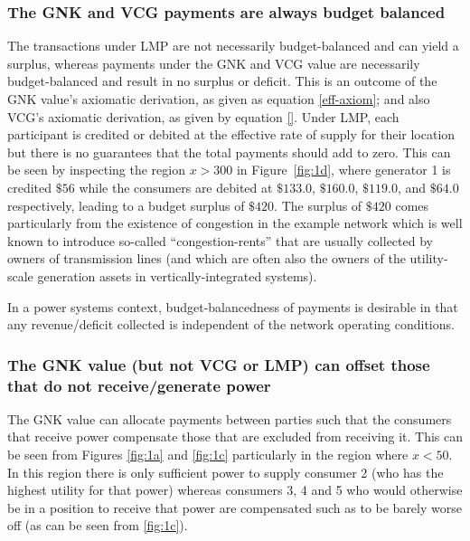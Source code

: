 \subsubsection*{The GNK and VCG payments are always budget balanced}
The transactions under LMP are not necessarily budget-balanced and can yield a surplus, whereas payments under the GNK and VCG value are necessarily budget-balanced and result in no surplus or deficit.
This is an outcome of the GNK value's axiomatic derivation, as given as equation \eqref{eff-axiom}; and also VCG's axiomatic derivation, as given by equation \ref{}.
Under LMP, each participant is credited or debited at the effective rate of supply for their location but there is no guarantees that the total payments should add to zero.
This can be seen by inspecting the region $x>300$ in Figure~\ref{fig:1d}, where generator 1 is credited $\$56$ while the consumers are debited at $\$133.0$, $\$160.0$, $\$119.0$, and $\$64.0$ respectively, leading to a budget surplus of $\$420$.
The surplus of $\$420$ comes particularly from the existence of congestion in the example network which is well known to introduce so-called ``congestion-rents'' that are usually collected by owners of transmission lines \cite{lmp2} (and which are often also the owners of the utility-scale generation assets in vertically-integrated systems).

In a power systems context, budget-balancedness of payments is desirable in that any revenue/deficit collected is independent of the network operating conditions.

\subsubsection*{The GNK value (but not VCG or LMP) can offset those that do not receive/generate power}
The GNK value can allocate payments between parties such that the consumers that receive power compensate those that are excluded from receiving it.
This can be seen from Figures \ref{fig:1a} and \ref{fig:1c} particularly in the region where $x<50$.
In this region there is only sufficient power to supply consumer 2 (who has the highest utility for that power) whereas consumers 3, 4 and 5 who would otherwise be in a position to receive that power are
compensated such as to be barely worse off (as can be seen from \ref{fig:1c}).

